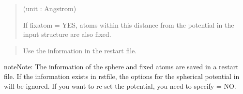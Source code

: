 \documentclass[a4paper,11pt,oneside,english]{sphinxmanual}
\begin{document}
 
\begin{quote}

 (unit : Angstrom)

If fixatom = YES, atoms within this distance from the potential in the input structure are also fixed.
\end{quote}

 
\begin{quote}


Use the information in the restart file.
\end{quote}

\begin{sphinxadmonition}{note}{Note:}
The information of the sphere and fixed atoms are saved in a restart file. If the
information exists in rstfile, the options for the spherical potential in \sphinxstylestrong{{[}BOUNDARY{]}} will be
ignored. If you want to re-set the potential, you need to specify  = NO.
\end{sphinxadmonition}
\end{document}
